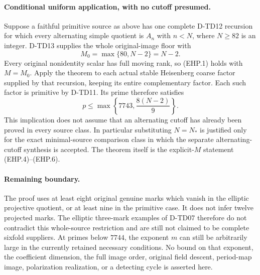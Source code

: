 \paragraph{Conditional uniform application, with no cutoff presumed.}
Suppose a faithful primitive source as above has one complete D-TD12
recursion for which every alternating simple quotient is \(A_n\) with
\(n<N\), where \(N\ge82\) is an integer.  D-TD13 supplies the whole
original-image floor with
\[
             M_0=\max\{80,N-2\}=N-2.
 \tag{EHP.14}
\]
Every original nonidentity scalar has full moving rank, so (EHP.1)
holds with \(M=M_0\).  Apply the theorem to each actual stable
Heisenberg coarse factor supplied by that recursion, keeping its
entire complementary factor.  Each such factor is primitive by
D-TD11.  Its prime therefore satisfies
\[
                   p\le
           \max\!\left\{7743,\frac{8(N-2)}9\right\}.
 \tag{EHP.15}
\]
This implication does not assume that an alternating cutoff has
already been proved in every source class.  In particular substituting
\(N=N_*\) is justified only for the exact minimal-source comparison
class in which the separate alternating-cutoff synthesis is accepted.
The theorem itself is the explicit-\(M\) statement (EHP.4)--(EHP.6).

\paragraph{Remaining boundary.}
The proof uses at least eight original genuine marks which vanish in
the elliptic projective quotient, or at least nine in the primitive
case.  It does not infer twelve projected marks.  The elliptic
three-mark examples of D-TD07 therefore do not contradict this
whole-source restriction and are still not claimed to be complete
sixfold suppliers.  At primes below \(7744\), the exponent \(m\)
can still be arbitrarily large in the currently retained necessary
conditions.  No bound on that exponent, the coefficient dimension,
the full image order, original field descent, period-map image,
polarization realization, or a detecting cycle is asserted here.
